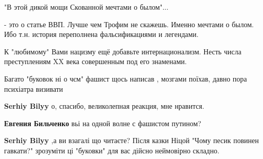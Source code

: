 \begin{itemize}
\begin{itemize}
\end{itemize}

 

"В этой дикой мощи Скованной мечтами о былом"...

- это о статье ВВП. Лучше чем Трофим не скажешь. Именно мечтами о былом. Ибо
т.н. история переполнена фальсификациями и легендами.

К "любимому" Вами нацизму ещё добавьте интернационализм. Несть числа
преступлениям XX века совершенным под его знаменами.



 

Багато "буковок ні о чєм" фашист щось написав , мозгами поїхав, давно пора
психіатра визивати

\begin{itemize}
 
\textbf{Serhiy Bilyy} о, спасибо, великолепная реакция, мне нравится.

 
\textbf{Евгения Бильченко} вьі на одной волне с фашистом путином?

 
\textbf{Serhiy Bilyy} ,а ви взагалі що читаєте? Після казки Ніцой "Чому песик повинен гавкати?" зрозуміти ці "буковки" для вас дійсно неймовірно складно.


\end{itemize}
\end{itemize}
